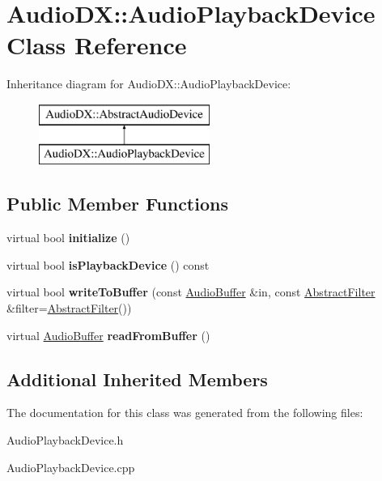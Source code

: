 \hypertarget{class_audio_d_x_1_1_audio_playback_device}{\section{Audio\-D\-X\-:\-:Audio\-Playback\-Device Class Reference}
\label{class_audio_d_x_1_1_audio_playback_device}
}
Inheritance diagram for Audio\-D\-X\-:\-:Audio\-Playback\-Device\-:\begin{figure}[H]
\begin{center}
\leavevmode
\includegraphics[height=2.000000cm]{class_audio_d_x_1_1_audio_playback_device}
\end{center}
\end{figure}
\subsection*{Public Member Functions}
\begin{DoxyCompactItemize}
\item 
\hypertarget{class_audio_d_x_1_1_audio_playback_device_abffabc4a3dbe82dfe059a8d5d8fd916c}{virtual bool {\bfseries initialize} ()}\label{class_audio_d_x_1_1_audio_playback_device_abffabc4a3dbe82dfe059a8d5d8fd916c}

\item 
\hypertarget{class_audio_d_x_1_1_audio_playback_device_ab3a966c43557f8cee9bac54d46ef08a0}{virtual bool {\bfseries is\-Playback\-Device} () const }\label{class_audio_d_x_1_1_audio_playback_device_ab3a966c43557f8cee9bac54d46ef08a0}

\item 
\hypertarget{class_audio_d_x_1_1_audio_playback_device_a2f018910e1511f29864ac8fb98b19e87}{virtual bool {\bfseries write\-To\-Buffer} (const \hyperlink{class_audio_d_x_1_1_audio_buffer}{Audio\-Buffer} \&in, const \hyperlink{struct_audio_d_x_1_1_abstract_filter}{Abstract\-Filter} \&filter=\hyperlink{struct_audio_d_x_1_1_abstract_filter}{Abstract\-Filter}())}\label{class_audio_d_x_1_1_audio_playback_device_a2f018910e1511f29864ac8fb98b19e87}

\item 
\hypertarget{class_audio_d_x_1_1_audio_playback_device_ae364b268314fbb1bea0bc25447b00088}{virtual \hyperlink{class_audio_d_x_1_1_audio_buffer}{Audio\-Buffer} {\bfseries read\-From\-Buffer} ()}\label{class_audio_d_x_1_1_audio_playback_device_ae364b268314fbb1bea0bc25447b00088}

\end{DoxyCompactItemize}
\subsection*{Additional Inherited Members}


The documentation for this class was generated from the following files\-:\begin{DoxyCompactItemize}
\item 
Audio\-Playback\-Device.\-h\item 
Audio\-Playback\-Device.\-cpp\end{DoxyCompactItemize}
